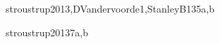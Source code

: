 \begin{syllabus}
\begin{unit}{\SDFFundamentalProgrammingConcepts}{}{stroustrup2013,DVandervoorde1,StanleyB13}{5}{a,b}
\begin{learningoutcomes}
	\item \SDFFundamentalProgrammingConceptsLOAnalyzeAndBehavior [\Usage]
	\item \SDFFundamentalProgrammingConceptsLOIdentifyAndOf [\Usage]
	\item \SDFFundamentalProgrammingConceptsLOWritePrograms [\Usage]
	\item \SDFFundamentalProgrammingConceptsLOModify [\Usage]
	\item \SDFFundamentalProgrammingConceptsLODesignImplement [\Usage]
	\item \SDFFundamentalProgrammingConceptsLOWriteAUses [\Usage]
	\item \SDFFundamentalProgrammingConceptsLOChooseAppropriateIteration [\Usage]
	\item \SDFFundamentalProgrammingConceptsLODescribeTheRecursion [\Usage]
	\item \SDFFundamentalProgrammingConceptsLOIdentifyTheAndCase [\Usage]
\end{learningoutcomes}
\end{unit}

\begin{unit}{\PLObjectOrientedProgramming}{}{stroustrup2013}{7}{a,b}
\begin{topics}
	\item \PLObjectOrientedProgrammingTopicObject
	\item \PLObjectOrientedProgrammingTopicDefinition
	\item \PLObjectOrientedProgrammingTopicSubclasses
	\item \PLObjectOrientedProgrammingTopicDynamic
	\item \PLObjectOrientedProgrammingTopicSubtyping
	\item \PLObjectOrientedProgrammingTopicObjectOriented
	\item \PLObjectOrientedProgrammingTopicUsing
\end{topics}

\begin{learningoutcomes}
	\item \PLObjectOrientedProgrammingLODesignAndClass [\Usage]
	\item \PLObjectOrientedProgrammingLOUseSubclassing [\Usage]
	\item \PLObjectOrientedProgrammingLOCorrectly [\Usage]
	\item \PLObjectOrientedProgrammingLOCompareAndThe [\Usage]
	\item \PLObjectOrientedProgrammingLOExplainTheObject [\Usage] 
	\item \PLObjectOrientedProgrammingLOUseObject [\Usage]
	\item \PLObjectOrientedProgrammingLODefineAndAnd [\Usage]
\end{learningoutcomes}
\end{unit}


\end{syllabus}
